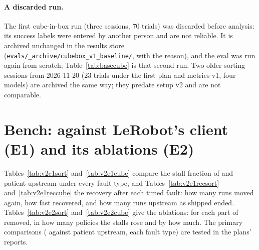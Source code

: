 \paragraph{A discarded run.} The first cube-in-box run (three sessions, 70 trials) was discarded before analysis:
its success labels were entered by another person and are not reliable. It is archived unchanged in the results store
(\texttt{evals/\_archive/cubebox\_v1\_baseline/}, with the reason), and the eval was run again from scratch;
Table~\ref{tab:basecube} is that second run. Two older sorting sessions from 2026-11-20 (23 trials under the first
plan and metrics v1, four models) are archived the same way; they predate setup v2 and are not comparable.

\begin{table}[htbp]
  \centering
  \small
  \caption{Baselines on sorting: task success with Wilson 95\% intervals (bold: the best policy).}\label{tab:basesort}
\end{table}

\begin{table}[htbp]
  \centering
  \small
  \caption{Baselines on cube in box v1, as Table~\ref{tab:basesort}.}\label{tab:basecube}
\end{table}



\section{Bench: \drtc{} against LeRobot's client (E1) and its ablations (E2)}\label{sec:v2bench}

Tables~\ref{tab:v2e1sort} and~\ref{tab:v2e1cube} compare the stall fraction of \drtc{} and patient upstream
under every fault type, and Tables~\ref{tab:v2e1recsort} and~\ref{tab:v2e1reccube} the recovery after each timed
fault: how many runs moved again, how fast \drtc{} recovered, and how many runs upstream as shipped ended.
Tables~\ref{tab:v2e2sort} and~\ref{tab:v2e2cube} give the ablations: for each part of \drtc{} removed, in how many
policies the stalls rose and by how much. The primary comparisons (\drtc{} against patient upstream, each fault type)
are tested in the plans' reports.

